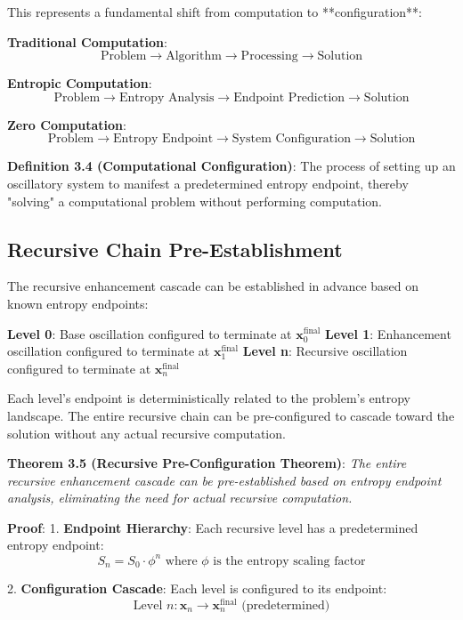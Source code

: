 \documentclass[12pt,a4paper]{article}
\theoremstyle{definition}
\begin{document}
This represents a fundamental shift from computation to **configuration**:

\textbf{Traditional Computation}:
$$\text{Problem} \rightarrow \text{Algorithm} \rightarrow \text{Processing} \rightarrow \text{Solution}$$

\textbf{Entropic Computation}:
$$\text{Problem} \rightarrow \text{Entropy Analysis} \rightarrow \text{Endpoint Prediction} \rightarrow \text{Solution}$$

\textbf{Zero Computation}:
$$\text{Problem} \rightarrow \text{Entropy Endpoint} \rightarrow \text{System Configuration} \rightarrow \text{Solution}$$

\textbf{Definition 3.4 (Computational Configuration)}: The process of setting up an oscillatory system to manifest a predetermined entropy endpoint, thereby "solving" a computational problem without performing computation.

\subsection{Recursive Chain Pre-Establishment}

The recursive enhancement cascade can be established in advance based on known entropy endpoints:

\textbf{Level 0}: Base oscillation configured to terminate at $\mathbf{x}_0^{\text{final}}$
\textbf{Level 1}: Enhancement oscillation configured to terminate at $\mathbf{x}_1^{\text{final}}$
\textbf{Level n}: Recursive oscillation configured to terminate at $\mathbf{x}_n^{\text{final}}$

Each level's endpoint is deterministically related to the problem's entropy landscape. The entire recursive chain can be pre-configured to cascade toward the solution without any actual recursive computation.

\textbf{Theorem 3.5 (Recursive Pre-Configuration Theorem)}: \textit{The entire recursive enhancement cascade can be pre-established based on entropy endpoint analysis, eliminating the need for actual recursive computation.}

\textbf{Proof}:
1. \textbf{Endpoint Hierarchy}: Each recursive level has a predetermined entropy endpoint:
   $$S_n = S_0 \cdot \phi^n \text{ where } \phi \text{ is the entropy scaling factor}$$

2. \textbf{Configuration Cascade}: Each level is configured to its endpoint:
   $$\text{Level } n: \mathbf{x}_n \rightarrow \mathbf{x}_n^{\text{final}} \text{ (predetermined)}$$
\end{document}
